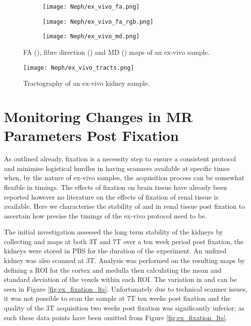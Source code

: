 \begin{figure}[H]
	\centering
	\begin{subfigure}[c]{0.31\textwidth}
		\centering
		\texttt{[image: Neph/ex\_vivo\_fa.png]} %
		\caption{}
		\label{fig:ex_ex_dti_fa}
	\end{subfigure}
	\hfill
	\begin{subfigure}[c]{0.31\textwidth}
		\centering
		\texttt{[image: Neph/ex\_vivo\_fa\_rgb.png]} %
		\caption{}
		\label{fig:ex_ex_dti_fa_rgb}
	\end{subfigure}
	\hfill	
	\begin{subfigure}[c]{0.31\textwidth}
		\centering
		\texttt{[image: Neph/ex\_vivo\_md.png]} %
		\caption{}
		\label{fig:ex_ex_dti_md}
	\end{subfigure}
	\caption{\ac{FA} (), fibre direction () and \ac{MD} () maps of an ex-vivo sample.}
	\label{fig:ex_ex_dti_maps}
\end{figure}

\begin{figure}[H]
	\centering
	\texttt{[image: Neph/ex\_vivo\_tracts.png]} %
	\caption{Tractography of an ex-vivo kidney sample.}
	\label{fig:ex_ex_tracts}	
\end{figure}

\newpage
\section{Monitoring Changes in MR Parameters Post Fixation}
\label{sec:ex_tissue_fixation}
As outlined already, fixation is a necessity step to ensure a consistent protocol and minimise logistical hurdles in having scanners available at specific times when, by the nature of ex-vivo samples, the acquisition process can be somewhat flexible in timings. The effects of fixation on brain tissue have already been reported \cite{birkl_effects_2016, schmierer_quantitative_2008, shatil_quantitative_2018} however no literature on the effects of fixation of renal tissue is available. Here we characterise the stability of \tone and \ttwostar in renal tissue post fixation to ascertain how precise the timings of the ex-vivo protocol need to be.

The initial investigation assessed the long term stability of the kidneys by collecting \tone and \ttwostar maps at both 3T and 7T over a ten week period post fixation, the kidneys were stored in \ac{PBS} for the duration of the experiment. An unfixed kidney was also scanned at 3T. Analysis was performed on the resulting maps by defining a \ac{ROI} for the cortex and medulla then calculating the mean and standard deviation of the voxels within each \ac{ROI}. The variation in \tone and \ttwostar can be seen in Figure \ref{fig:ex_fixation_lts}. Unfortunately due to technical scanner issues, it was not possible to scan the sample at 7T ten weeks post fixation and the quality of the 3T \tone acquisition two weeks post fixation was significantly inferior; as such these data points have been omitted from Figure \ref{fig:ex_fixation_lts}.

